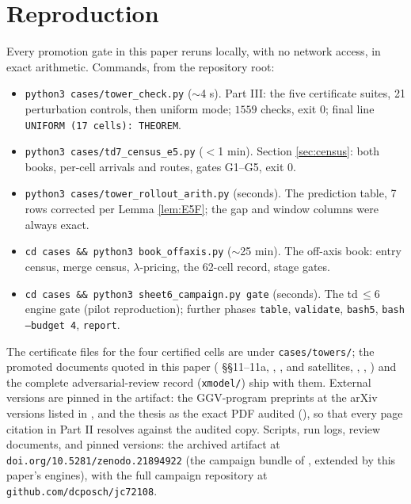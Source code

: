 \documentclass[11pt]{article}
\theoremstyle{definition}
\theoremstyle{remark}
\begin{document}
\appendix

\section{Reproduction}\label{app:repro}

Every promotion gate in this paper reruns locally, with no network access, in exact arithmetic. Commands, from the repository root:

\begin{itemize}
\item \texttt{python3 cases/tower\_check.py} ($\sim$4 s). Part III: the five certificate suites, 21 perturbation controls, then uniform mode; $1559$ checks, exit 0; final line \texttt{UNIFORM (17 cells): THEOREM}.
\item \texttt{python3 cases/td7\_census\_e5.py} ($<$1 min). Section \ref{sec:census}: both books, per-cell arrivals and routes, gates G1--G5, exit 0.
\item \texttt{python3 cases/tower\_rollout\_arith.py} (seconds). The prediction table, 7 rows corrected per Lemma \ref{lem:E5F}; the gap and window columns were always exact.
\item \texttt{cd cases \&\& python3 book\_offaxis.py} ($\sim$25 min). The off-axis book: entry census, merge census, $\lambda$-pricing, the 62-cell record, stage gates.
\item \texttt{cd cases \&\& python3 sheet6\_campaign.py gate} (seconds). The td$\,\leq6$ engine gate (pilot reproduction); further phases \texttt{table}, \texttt{validate}, \texttt{bash5}, \texttt{bash --budget 4}, \texttt{report}.
\end{itemize}

The certificate files for the four certified cells are under \texttt{cases/towers/}; the promoted documents quoted in this paper ( \S\S11--11a, , ,  and satellites, , , ) and the complete adversarial-review record (\texttt{xmodel/}) ship with them. External versions are pinned in the artifact: the GGV-program preprints at the arXiv versions listed in \cite{P1}, and the thesis \cite{Sigray} as the exact PDF audited (), so that every page citation in Part II resolves against the audited copy. Scripts, run logs, review documents, and pinned versions: the archived artifact at \texttt{doi.org/10.5281/zenodo.21894922} (the campaign bundle of \cite{P1}, extended by this paper's engines), with the full campaign repository at \texttt{github.com/dcposch/jc72108}.
\end{document}
